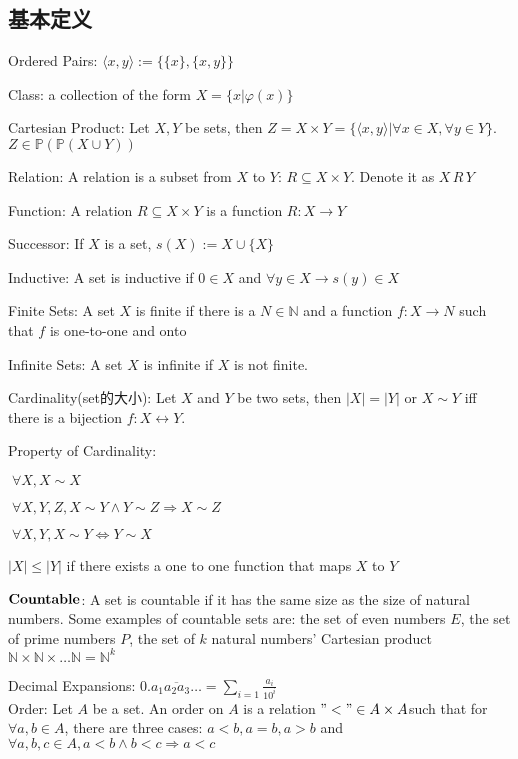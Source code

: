 \documentclass[12pt,a4paper]{ctexrep}
\begin{document}
\subsection{基本定义}
Ordered Pairs: $\langle x,y\rangle := \{\{x\},\{x,y\}\}$

Class: a collection of the form $X=\{x|\varphi(x)\}$

Cartesian Product: Let $X,Y$ be sets, then $Z = X \times Y = \{\langle x,y\rangle|\forall x\in X, \forall y \in Y\}$. $Z \in \mathbb{P}(\mathbb{P}(X \cup Y))$

Relation: A relation is a subset from $X$ to $Y$: $R\subseteq X\times Y$. Denote it as $X\,R\,Y$

Function: A relation $R \subseteq X \times Y$ is a function $R:X \rightarrow Y$

Successor: If $X$ is a set, $s(X) := X \cup \{X\}$

Inductive: A set is inductive if $0\in X$ and $\forall y \in X \rightarrow s(y) \in X$

Finite Sets: A set $X$ is finite if there is a $N \in \mathbb{N}$ and a function $f:X \rightarrow N$ such that $f$ is one-to-one and onto

Infinite Sets: A set $X$ is infinite if $X$ is not finite.

Cardinality(set的大小): Let $X$ and $Y$ be two sets, then $|X| = |Y|$ or $X\sim Y$ iff there is a bijection $f:X \leftrightarrow Y$. 

Property of Cardinality: 

$\;\forall X, X \sim X$

$\;\forall X,Y,Z, X\sim Y \wedge Y\sim Z \Rightarrow X \sim Z$

$\;\forall X,Y, X\sim Y \Leftrightarrow Y \sim X$

$|X|\leqslant|Y|$ if there exists a one to one function that maps $X$ to $Y$

$\bold{Countable}$: A set is countable if it has the same size as the size of natural numbers. Some examples of countable sets are: the set of even numbers $E$, the set of prime numbers $P$, the set of $k$ natural numbers' Cartesian product $\mathbb{N} \times \mathbb{N} \times \dots\mathbb{N} = \mathbb{N}^k$

Decimal Expansions: 0.$\overline{a_1a_2a_3\dots} = \sum_{i=1} \frac{a_i}{10^i}$\\

Order: Let $A$ be a set. An order on $A$ is a relation $"<"\in A\times A$such that for $\forall a,b \in A$, there are three cases: $a<b,a=b,a>b$ and $\forall a,b,c \in A, a<b \wedge b<c \Rightarrow a<c$
\end{document}
